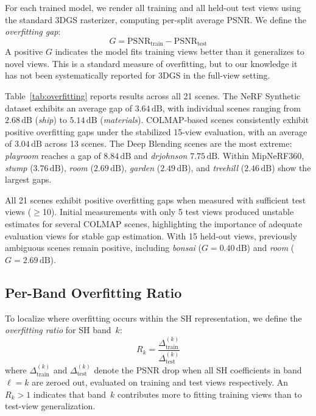 \documentclass[sigconf,review]{acmart}
\newcommand{\dB}{\,\text{dB}}
\newcommand{\R}[1]{R_{#1}}
\begin{document}
For each trained model, we render all training and all held-out test views using the standard 3DGS rasterizer, computing per-split average PSNR.
We define the \emph{overfitting gap}:
\begin{equation}
  G = \text{PSNR}_{\text{train}} - \text{PSNR}_{\text{test}}
\end{equation}
A positive $G$ indicates the model fits training views better than it generalizes to novel views.
This is a standard measure of overfitting, but to our knowledge it has not been systematically reported for 3DGS in the full-view setting.

Table~\ref{tab:overfitting} reports results across all 21 scenes.
The NeRF Synthetic dataset exhibits an average gap of $\mathbf{3.64}\dB$, with individual scenes ranging from $2.68\dB$ (\textit{ship}) to $5.14\dB$ (\textit{materials}).
COLMAP-based scenes consistently exhibit positive overfitting gaps under the stabilized 15-view evaluation, with an average of $3.04\dB$ across 13 scenes.
The Deep Blending scenes are the most extreme: \textit{playroom} reaches a gap of $\mathbf{8.84}\dB$ and \textit{drjohnson} $7.75\dB$.
Within MipNeRF360, \textit{stump} ($3.76\dB$), \textit{room} ($2.69\dB$), \textit{garden} ($2.49\dB$), and \textit{treehill} ($2.46\dB$) show the largest gaps.

All 21 scenes exhibit positive overfitting gaps when measured with sufficient test views ($\geq$10).
Initial measurements with only 5 test views produced unstable estimates for several COLMAP scenes, highlighting the importance of adequate evaluation views for stable gap estimation.
With 15 held-out views, previously ambiguous scenes remain positive, including \textit{bonsai} ($G{=}0.40\dB$) and \textit{room} ($G{=}2.69\dB$).

\subsection{Per-Band Overfitting Ratio}
\label{sec:perband}

To localize where overfitting occurs within the SH representation, we define the \emph{overfitting ratio} for SH band~$k$:
\begin{equation}
  \R{k} = \frac{\Delta_{\text{train}}^{(k)}}{\Delta_{\text{test}}^{(k)}}
  \label{eq:overfitting_ratio}
\end{equation}
where $\Delta_{\text{train}}^{(k)}$ and $\Delta_{\text{test}}^{(k)}$ denote the PSNR drop when all SH coefficients in band $\ell{=}k$ are zeroed out, evaluated on training and test views respectively.
An $\R{k}{>}1$ indicates that band~$k$ contributes more to fitting training views than to test-view generalization.
\end{document}
